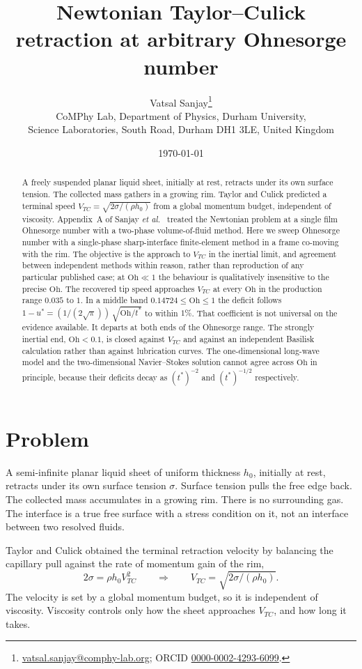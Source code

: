 \documentclass[11pt,a4paper]{article}
\title{Newtonian Taylor--Culick retraction at arbitrary Ohnesorge number}
\author{%
  Vatsal Sanjay\thanks{%
    \href{mailto:vatsal.sanjay@comphy-lab.org}{vatsal.sanjay@comphy-lab.org};
    ORCID \href{https://orcid.org/0000-0002-4293-6099}{0000-0002-4293-6099}.}\\[2pt]
  \normalsize CoMPhy Lab, Department of Physics, Durham University,\\
  \normalsize Science Laboratories, South Road, Durham DH1 3LE, United Kingdom}
\date{\today}
\newcommand{\Oh}{\mathrm{Oh}}
\newcommand{\Vtc}{V_{TC}}
\newcommand{\ustar}{u^{*}}
\newcommand{\tstar}{t^{*}}
\begin{document}
\maketitle

\begin{abstract}
A freely suspended planar liquid sheet, initially at rest, retracts under its
own surface tension. The collected mass gathers in a growing rim. Taylor
\cite{taylor1959} and Culick \cite{culick1960} predicted a terminal speed
$\Vtc = \sqrt{2\sigma/(\rho h_0)}$ from a global momentum budget, independent
of viscosity. Appendix~A of Sanjay \textit{et al.}\ \cite{sanjay2022} treated
the Newtonian problem at a single film Ohnesorge number with a two-phase
volume-of-fluid method. Here we sweep Ohnesorge number with a single-phase
sharp-interface finite-element method in a frame co-moving with the rim.
The objective is the approach to $\Vtc$ in the inertial limit, and agreement
between independent methods within reason, rather than reproduction of any
particular published case; at $\Oh \ll 1$ the behaviour is qualitatively
insensitive to the precise $\Oh$.
The recovered tip speed approaches $\Vtc$ at every $\Oh$ in the production
range $0.035$ to $1$. In a middle band $0.14724 \le \Oh \le 1$ the deficit
follows
$1 - \ustar = (1/(2\sqrt{\pi}))\,\sqrt{\Oh/\tstar}$
to within $1\%$. That coefficient is not universal on the evidence available.
It departs at both ends of the Ohnesorge range. The strongly inertial end,
$\Oh < 0.1$, is closed against $\Vtc$ and against an independent Basilisk
calculation rather than against lubrication curves. The one-dimensional
long-wave model and the two-dimensional Navier--Stokes solution cannot agree
across $\Oh$ in principle, because their deficits decay as
$(t^{*})^{-2}$ and $(t^{*})^{-1/2}$ respectively.
\end{abstract}

\section{Problem}
\label{sec:problem}

A semi-infinite planar liquid sheet of uniform thickness $h_0$, initially at
rest, retracts under its own surface tension $\sigma$. Surface tension pulls
the free edge back. The collected mass accumulates in a growing rim. There is
no surrounding gas. The interface is a true free surface with a stress
condition on it, not an interface between two resolved fluids.

Taylor \cite{taylor1959} and Culick \cite{culick1960} obtained the terminal
retraction velocity by balancing the capillary pull against the rate of
momentum gain of the rim,
\begin{equation}
  2\sigma = \rho h_0 \Vtc^{2}
  \qquad\Rightarrow\qquad
  \Vtc = \sqrt{2\sigma/(\rho h_0)}.
\end{equation}
The velocity is set by a global momentum budget, so it is independent of
viscosity. Viscosity controls only how the sheet approaches $\Vtc$, and how
long it takes.
\end{document}
